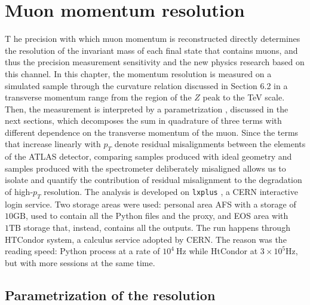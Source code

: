 \documentclass[11pt,a4paper,twoside,openright]{report}
\begin{document}
\clearpage

\chapter{Muon momentum resolution}

\lettrine[lines=3,loversize=0.1,lraise=0.05]{T}{} he precision with which muon momentum is reconstructed directly determines the resolution of the invariant mass of each final state that contains muons, and thus the precision measurement sensitivity and the new physics research based on this channel. In this chapter, the momentum resolution is measured on a simulated sample through the curvature relation discussed in Section 6.2 in a transverse momentum range from the region of the \(Z\) peak to the TeV scale. Then, the measurement is interpreted by a parametrization \cite{ATLAS-MUON-2016, ATLAS-MCP-2023}, discussed in the next sections, which decomposes the sum in quadrature of three terms with different dependence on the transverse momentum of the muon. Since the terms that increase linearly with \(p_T\) denote residual misalignments between the elements of the ATLAS detector, comparing samples produced with ideal geometry and samples produced with the spectrometer deliberately misaligned allows us to isolate and quantify the contribution of residual misalignment to the degradation of high-\(p_T\) resolution. The analysis is developed on \texttt{lxplus} \cite{lxplus}, a CERN interactive login service. Two storage areas were used: personal area AFS \cite{afs} with a storage of \(10 \mathrm{GB}\), used to contain all the Python files and the proxy, and EOS \cite{eos} area with \(1\mathrm{TB}\) storage that, instead, contains all the outputs. The run happens through HTCondor \cite{htcondor} system, a calculus service adopted by CERN. The reason was the reading speed: Python process at a rate of \(10^4\ \mathrm{Hz}\) while HtCondor at \(3\times 10^5 \mathrm{Hz}\), but with more sessions at the same time.




\section{Parametrization of the resolution}
\label{sec:parametrizzazione}
\end{document}

